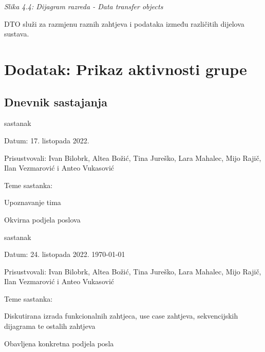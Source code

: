 \documentclass{article}
\begin{document}
	\begin{center}
		\textit{Slika 4.4: Dijagram razreda - Data transfer objects}
	\end{center}
	DTO služi za razmjenu raznih zahtjeva i podataka između različitih dijelova sustava.
	
	\eject
	\section{Dodatak: Prikaz aktivnosti grupe}
	\subsection{Dnevnik sastajanja}
	\begin{packed_enum}
		\item sastanak
		
		\item[] \begin{packed_item}
			\item Datum: 17. listopada 2022.
			\item Prisustvovali: Ivan Bilobrk, Altea Božić, Tina Jureško, Lara Mahalec, Mijo Rajič, Ilan Vezmarović i Anteo Vukasović
			\item Teme sastanka:
			\begin{packed_item}
				\item  Upoznavanje tima
				\item  Okvirna podjela poslova
			\end{packed_item}
		\end{packed_item}
		
		\item sastanak
		\item[] \begin{packed_item}
			\item Datum: 24. listopada 2022. \today
			\item Prisustvovali:  Ivan Bilobrk, Altea Božić, Tina Jureško, Lara Mahalec, Mijo Rajič, Ilan Vezmarović i Anteo Vukasović
			\item Teme sastanka:
			\begin{packed_item}
				\item  Diskutirana izrada funkcionalnih zahtjeca, use case zahtjeva, sekvencijskih dijagrama te ostalih zahtjeva
				\item  Obavljena konkretna podjela posla
			\end{packed_item}
		\end{packed_item}
	

\end{packed_enum}
\end{document}
